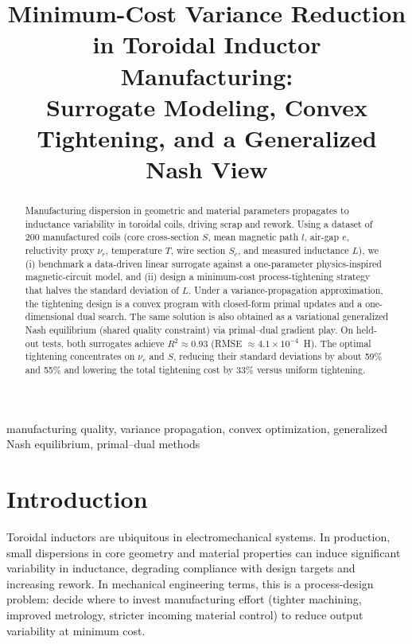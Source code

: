 \documentclass[conference]{IEEEtran}
\title{Minimum-Cost Variance Reduction in Toroidal Inductor Manufacturing:%
\\Surrogate Modeling, Convex Tightening, and a Generalized Nash View}
\author{\IEEEauthorblockN{C\^{o}me Muntu-Quituba (213256232)}
\IEEEauthorblockA{Southeast University\\
Email: come.muntu-quituba@ensam.eu}
}
\begin{document}
\maketitle

\begin{abstract}
Manufacturing dispersion in geometric and material parameters propagates to inductance variability in toroidal coils, driving scrap and rework. Using a dataset of 200 manufactured coils (core cross-section $S$, mean magnetic path $l$, air-gap $e$, reluctivity proxy $\nu_r$, temperature $T$, wire section $S_c$, and measured inductance $L$), we (i) benchmark a data-driven linear surrogate against a one-parameter physics-inspired magnetic-circuit model, and (ii) design a minimum-cost process-tightening strategy that halves the standard deviation of $L$. Under a variance-propagation approximation, the tightening design is a convex program with closed-form primal updates and a one-dimensional dual search. The same solution is also obtained as a variational generalized Nash equilibrium (shared quality constraint) via primal--dual gradient play. On held-out tests, both surrogates achieve $R^2\approx0.93$ (RMSE $\approx4.1\times10^{-4}$~H). The optimal tightening concentrates on $\nu_r$ and $S$, reducing their standard deviations by about 59\% and 55\% and lowering the total tightening cost by 33\% versus uniform tightening.
\end{abstract}

\begin{IEEEkeywords}
manufacturing quality, variance propagation, convex optimization, generalized Nash equilibrium, primal--dual methods
\end{IEEEkeywords}

\section{Introduction}
Toroidal inductors are ubiquitous in electromechanical systems. In production, small dispersions in core geometry and material properties can induce significant variability in inductance, degrading compliance with design targets and increasing rework. In mechanical engineering terms, this is a process-design problem: decide where to invest manufacturing effort (tighter machining, improved metrology, stricter incoming material control) to reduce output variability at minimum cost.
\end{document}
